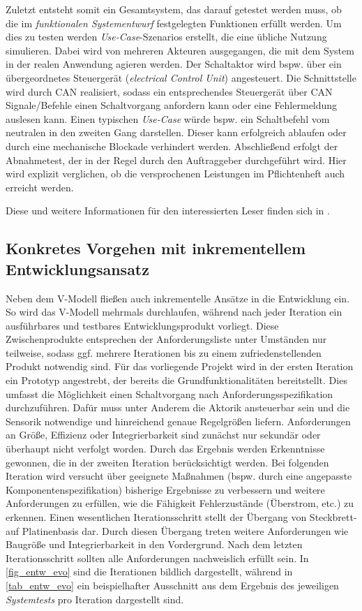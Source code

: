 Zuletzt entsteht somit ein Gesamtsystem, das darauf getestet werden muss, ob die im \textit{funktionalen Systementwurf} festgelegten Funktionen erfüllt werden. Um dies zu testen werden \textit{Use-Case}-Szenarios erstellt, die eine übliche Nutzung simulieren. Dabei wird von mehreren Akteuren ausgegangen, die mit dem System in der realen Anwendung agieren werden. Der Schaltaktor wird bspw. über ein übergeordnetes Steuergerät (\textit{electrical Control Unit}) angesteuert. Die Schnittstelle wird durch CAN realisiert, sodass ein entsprechendes Steuergerät über CAN Signale/Befehle einen Schaltvorgang anfordern kann oder eine Fehlermeldung auslesen kann. Einen typischen \textit{Use-Case} würde bspw. ein Schaltbefehl vom neutralen in den zweiten Gang darstellen. Dieser kann erfolgreich ablaufen oder durch eine mechanische Blockade verhindert werden. Abschließend erfolgt der Abnahmetest, der in der Regel durch den Auftraggeber durchgeführt wird. Hier wird explizit verglichen, ob die versprochenen Leistungen im Pflichtenheft auch erreicht werden.

Diese und weitere Informationen für den interessierten Leser finden sich in \cite{BasSof}.

\subsection{Konkretes Vorgehen mit inkrementellem Entwicklungsansatz}

Neben dem V-Modell fließen auch inkrementelle Ansätze in die Entwicklung ein. So wird das V-Modell mehrmals durchlaufen, während nach jeder Iteration ein ausführbares und testbares Entwicklungsprodukt vorliegt. Diese Zwischenprodukte entsprechen der Anforderungsliste unter Umständen nur teilweise, sodass ggf. mehrere Iterationen bis zu einem zufriedenstellenden Produkt notwendig sind. Für das vorliegende Projekt wird in der ersten Iteration ein Prototyp angestrebt, der bereits die Grundfunktionalitäten bereitstellt. Dies umfasst die Möglichkeit einen Schaltvorgang nach Anforderungsspezifikation durchzuführen. Dafür muss unter Anderem die Aktorik ansteuerbar sein und die Sensorik notwendige und hinreichend genaue Regelgrößen liefern. Anforderungen an Größe, Effizienz oder Integrierbarkeit sind zunächst nur sekundär oder überhaupt nicht verfolgt worden. Durch das Ergebnis werden Erkenntnisse gewonnen, die in der zweiten Iteration berücksichtigt werden. Bei folgenden Iteration wird versucht über geeignete Maßnahmen (bspw. durch eine angepasste Komponentenspezifikation) bisherige Ergebnisse zu verbessern und weitere Anforderungen zu erfüllen, wie die Fähigkeit Fehlerzustände (Überstrom, etc.) zu erkennen. Einen wesentlichen Iterationsschritt stellt der Übergang von Steckbrett- auf Platinenbasis dar. Durch diesen Übergang treten weitere Anforderungen wie Baugröße und Integrierbarkeit in den Vordergrund. Nach dem letzten Iterationsschritt sollten alle Anforderungen nachweislich erfüllt sein. In \autoref{fig_entw_evo} sind die Iterationen bildlich dargestellt, während in \autoref{tab_entw_evo} ein beispielhafter Ausschnitt aus dem Ergebnis des jeweiligen \textit{Systemtests} pro Iteration dargestellt sind.

